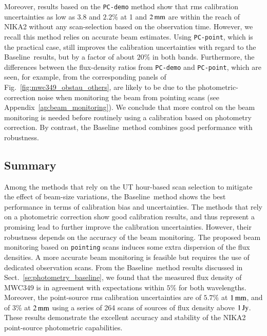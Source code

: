 \documentclass[traditionalabstract]{aa}
\newcommand{\baseline}{Baseline}%
\newcommand{\lp}[1]{#1}
\newcommand{\rev}[1]{#1}
\begin{document}
{Moreover, results based on the {\tt PC-demo} method show that rms
calibration uncertainties as low as $3.8$ and $2.2\%$
at 1 and $2\,\rm{mm}$ are within the reach of NIKA2 {\lp without any
scan-selection based on the observation time.}
However, we recall this method relies on 
accurate beam estimates. Using {\tt PC-point}, which is the
practical case, still improves the calibration uncertainties
with regard to the \baseline\ results, but by a factor of about $20\%$ in both
bands. Furthermore, the differences between
the flux-density ratios from {\tt PC-demo} and {\tt PC-point}, which are
seen, for example, from the corresponding panels of
Fig.~\ref{fig:mwc349_obstau_others}, are likely
to be due to the photometric-correction noise
when monitoring the beam from pointing scans (see
Appendix~\ref{ap:beam_monitoring}). We conclude that more
control on the beam monitoring is needed before routinely using a calibration
based on photometry correction. By contrast, the \baseline\ method
combines good performance with robustness.


\subsection{Summary}
\label{se:photometry_summary}
Among the methods that rely on the UT hour-based
scan selection to mitigate the effect of beam-size variations, the
\baseline\ method shows the best performance in terms of calibration
bias and uncertainties. The methods that rely on a photometric correction
show good calibration results, and thus represent a promising lead
to further improve the calibration uncertainties. However, their
robustness depends on the accuracy of the beam monitoring. {\lp The
proposed beam monitoring based on {\tt pointing} scans induces some
extra dispersion of the flux densities. A more accurate beam monitoring is
feasible but requires the use of dedicated observation scans.} 
From the \baseline\ method results discussed in
Sect.~\ref{se:photometry_baseline}, we found that the measured
flux density of MWC349 is in agreement with expectations within $5\%$
for both wavelengths. Moreover, the {\rev point-source} rms calibration
uncertainties are of $5.7\%$ at $1\,\rm{mm}$, and of $3\%$ at $2\,\rm{mm}$
using a series of 264 scans of sources of flux density above
$1\, \rm{Jy}$.
These results demonstrate the excellent accuracy and stability of the
NIKA2 {\rev point-source} photometric capabilities.

}
\end{document}
